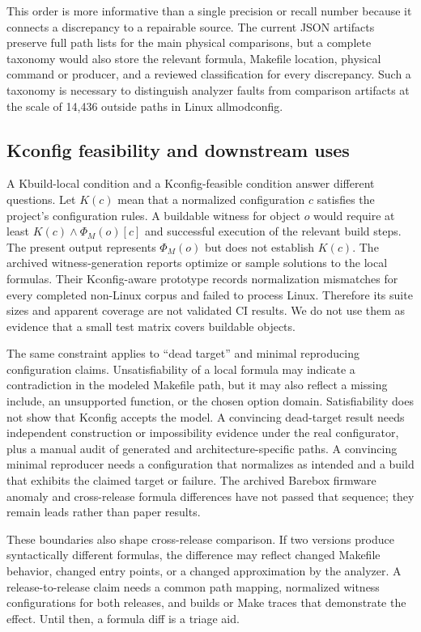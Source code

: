 \documentclass[acmsmall,screen,review]{acmart}
\begin{document}
This order is more informative than a single precision or recall number because it connects a discrepancy to a repairable source. The current JSON artifacts preserve full path lists for the main physical comparisons, but a complete taxonomy would also store the relevant formula, Makefile location, physical command or producer, and a reviewed classification for every discrepancy. Such a taxonomy is necessary to distinguish analyzer faults from comparison artifacts at the scale of 14,436 outside paths in Linux allmodconfig.

\subsection{Kconfig feasibility and downstream uses}
A Kbuild-local condition and a Kconfig-feasible condition answer different questions. Let $K(c)$ mean that a normalized configuration $c$ satisfies the project's configuration rules. A buildable witness for object $o$ would require at least $K(c)\land\Phi_M(o)[c]$ and successful execution of the relevant build steps. The present output represents $\Phi_M(o)$ but does not establish $K(c)$. The archived witness-generation reports optimize or sample solutions to the local formulas. Their Kconfig-aware prototype records normalization mismatches for every completed non-Linux corpus and failed to process Linux. Therefore its suite sizes and apparent coverage are not validated CI results. We do not use them as evidence that a small test matrix covers buildable objects.

The same constraint applies to ``dead target'' and minimal reproducing configuration claims. Unsatisfiability of a local formula may indicate a contradiction in the modeled Makefile path, but it may also reflect a missing include, an unsupported function, or the chosen option domain. Satisfiability does not show that Kconfig accepts the model. A convincing dead-target result needs independent construction or impossibility evidence under the real configurator, plus a manual audit of generated and architecture-specific paths. A convincing minimal reproducer needs a configuration that normalizes as intended and a build that exhibits the claimed target or failure. The archived Barebox firmware anomaly and cross-release formula differences have not passed that sequence; they remain leads rather than paper results.

These boundaries also shape cross-release comparison. If two versions produce syntactically different formulas, the difference may reflect changed Makefile behavior, changed entry points, or a changed approximation by the analyzer. A release-to-release claim needs a common path mapping, normalized witness configurations for both releases, and builds or Make traces that demonstrate the effect. Until then, a formula diff is a triage aid.
\end{document}

